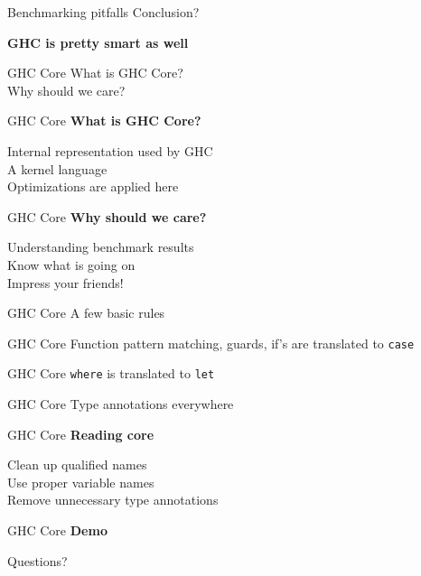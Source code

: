 \documentclass[20pt]{beamer}
\newcommand{\vspaced}{
    \vspace{5mm}
}
\begin{document}
\begin{frame}{Benchmarking pitfalls}
    Conclusion? \\
    \vspaced
    \textbf{GHC is pretty smart as well}
\end{frame}


\begin{frame}{GHC Core}
    What is GHC Core? \\
    Why should we care?
\end{frame}

\begin{frame}{GHC Core}
    \textbf{What is GHC Core?} \\
    \vspaced
    Internal representation used by GHC \\
    A kernel language \\
    Optimizations are applied here
\end{frame}

\begin{frame}{GHC Core}
    \textbf{Why should we care?} \\
    \vspaced
    Understanding benchmark results \\
    Know what is going on \\
    Impress your friends!
\end{frame}

\begin{frame}{GHC Core}
    A few basic rules
\end{frame}

\begin{frame}{GHC Core}
    Function pattern matching, guards, if's are translated to \texttt{case}
\end{frame}

\begin{frame}{GHC Core}
    \texttt{where} is translated to \texttt{let}
\end{frame}

\begin{frame}{GHC Core}
    Type annotations everywhere
\end{frame}

\begin{frame}{GHC Core}
    \textbf{Reading core} \\
    \vspaced
    Clean up qualified names \\
    Use proper variable names \\
    Remove unnecessary type annotations
\end{frame}

\begin{frame}{GHC Core}
    \textbf{Demo}
\end{frame}

\begin{frame}[plain]
    \begin{center}
    \huge{Questions?}
    \end{center}
\end{frame}
\end{document}
